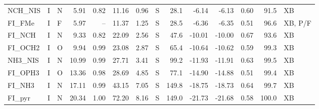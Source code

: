 {\begin{longtable}{lllrrrrlrrrrrl}
NCH\_NIS & I & N & 5.91 & 0.82 & 11.16 & 0.96 & S & 28.1 & -6.14 & -6.13 & 0.60 & 91.5 & XB\\
FI\_FMe & I & F & 5.97 & -- & 11.37 & 1.25 & S & 28.5 & -6.36 & -6.35 & 0.51 & 96.6 & XB, P/F\\
FI\_NCH & I & N & 9.33 & 0.82 & 22.09 & 2.56 & S & 47.6 & -10.01 & -10.00 & 0.67 & 93.6 & XB\\
FI\_OCH2 & I & O & 9.94 & 0.99 & 23.08 & 2.87 & S & 65.4 & -10.64 & -10.62 & 0.59 & 99.3 & XB\\
NH3\_NIS & I & N & 10.99 & 0.99 & 27.71 & 3.41 & S & 99.2 & -11.93 & -11.91 & 0.63 & 99.5 & XB\\
FI\_OPH3 & I & O & 13.36 & 0.98 & 28.69 & 4.85 & S & 77.1 & -14.90 & -14.88 & 0.51 & 99.4 & XB\\
FI\_NH3 & I & N & 17.11 & 0.99 & 43.15 & 7.05 & S & 149.8 & -18.75 & -18.73 & 0.64 & 99.7 & XB\\
FI\_pyr & I & N & 20.34 & 1.00 & 72.20 & 8.16 & S & 149.0 & -21.73 & -21.68 & 0.58 & 100.0 & XB\\
\end{longtable}}
